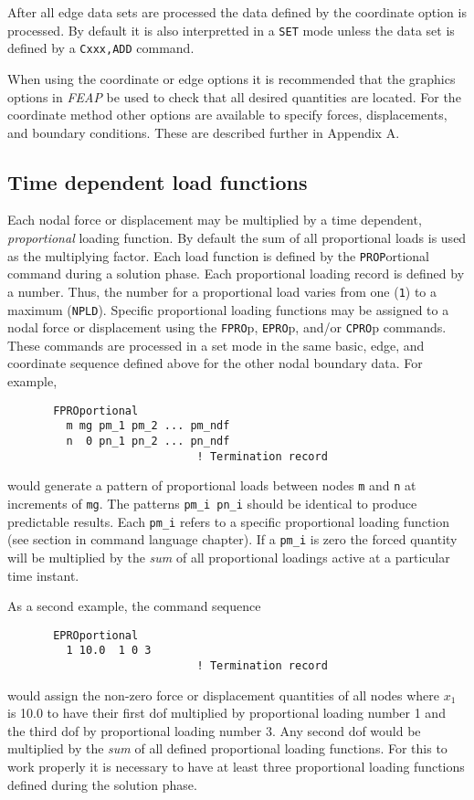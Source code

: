 After all edge data sets are processed the data defined by the coordinate
option is processed.  By default it is also interpretted in a {\tt SET}
mode unless the data set is defined by a {\tt Cxxx,ADD} command.

When using the coordinate or edge options it is recommended that the graphics
options in {\sl FEAP} be used to check that all desired quantities are located.
For the coordinate method other options are available to specify
forces, displacements, and boundary conditions.  These are described further
in Appendix A.

\subsection{Time dependent load functions}

Each nodal force or displacement may be multiplied by a time dependent,
{\it proportional} loading function.  By default the sum of all proportional
loads is used as the multiplying factor.  Each load function is defined
by the {\tt PROP}ortional command during a solution phase.  Each proportional
loading record is defined by a number.  Thus, the number for a proportional
load varies from one ({\tt 1}) to a maximum ({\tt NPLD}). Specific
proportional loading functions may be assigned to a nodal force or
displacement using the {\tt FPRO}p, {\tt EPRO}p, and/or {\tt CPRO}p commands. 
These commands are processed in a set mode in the same basic, edge, and
coordinate sequence defined above for the other nodal boundary data.
For example,
\begin{verbatim}
       FPROportional
         m mg pm_1 pm_2 ... pm_ndf
         n  0 pn_1 pn_2 ... pn_ndf
                             ! Termination record
\end{verbatim}
would generate a pattern of proportional loads between nodes {\tt m} and {\tt n}
at increments of {\tt mg}.  The patterns {\tt pm\_i pn\_i} should be identical
to produce predictable results. 
Each {\tt pm\_i} refers to a specific proportional loading function (see
section in command language chapter).  If a {\tt pm\_i} is zero the forced
quantity will be multiplied by the {\it sum} of all proportional loadings
active at a particular time instant.


As a second example, the command sequence
\begin{verbatim}
       EPROportional
         1 10.0  1 0 3
                             ! Termination record
\end{verbatim}
would assign the non-zero force or displacement quantities of
all nodes where $x_1$ is 10.0 to have their first dof
multiplied by proportional loading number 1 and the third dof by proportional
loading number 3.  Any second dof would be multiplied by the {\it sum}
of all defined proportional loading functions.  For this to work properly
it is necessary to have at least three proportional loading functions
defined during the solution phase.


